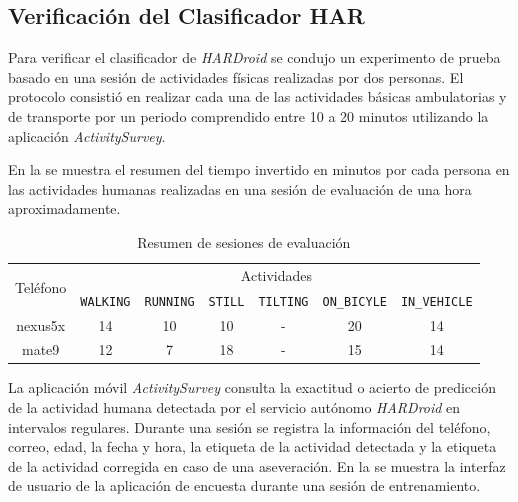 \subsection{Verificación del Clasificador HAR}

Para verificar el clasificador  de \emph{HARDroid }se condujo
un experimento de prueba basado en una sesión de actividades físicas
realizadas por dos personas. El protocolo consistió en realizar cada
una de las actividades básicas ambulatorias y de transporte por un
periodo comprendido entre 10 a 20 minutos utilizando la aplicación
\emph{ActivitySurvey}. 

En la  se muestra el resumen del tiempo invertido
en minutos por cada persona en las actividades humanas realizadas
en una sesión de evaluación de una hora aproximadamente.

\begin{table}[th]
\begin{centering}
\begin{tabular}{|c|c|c|c|c|c|c|}
\hline 
\multirow{2}{*}{Teléfono} & \multicolumn{6}{c|}{Actividades}\tabularnewline
\cline{2-7} 
 & \texttt{\footnotesize{}WALKING} & \texttt{\footnotesize{}RUNNING} & \texttt{\footnotesize{}STILL} & \texttt{\footnotesize{}TILTING} & \texttt{\footnotesize{}ON\_BICYLE} & \texttt{\footnotesize{}IN\_VEHICLE}\tabularnewline
\hline 
\hline 
nexus5x & 14 & 10 & 10 & - & 20 & 14\tabularnewline
\hline 
mate9 & 12 & 7 & 18 & - & 15 & 14\tabularnewline
\hline 
\end{tabular}
\par\end{centering}
\caption{\label{tab6:vsesiones}Resumen de sesiones de evaluación}
\end{table}

La aplicación móvil \emph{ActivitySurvey} consulta la exactitud o
acierto de predicción de la actividad humana detectada por el servicio
autónomo \emph{HARDroid} en intervalos regulares. Durante una sesión
se registra la información del teléfono, correo, edad, la fecha y
hora, la etiqueta de la actividad detectada y la etiqueta de la actividad
corregida en caso de una aseveración. En la 
se muestra la interfaz de usuario de la aplicación de encuesta durante
una sesión de entrenamiento.

